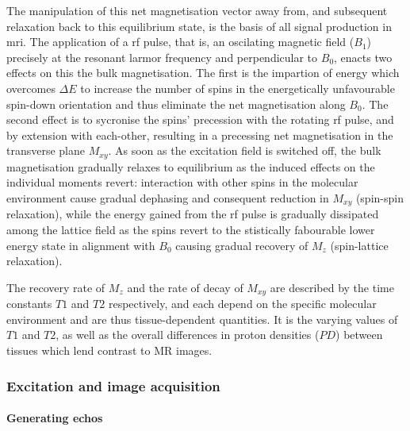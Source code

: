 The manipulation of this net magnetisation vector away from, and subsequent relaxation back to this equilibrium state, is the basis of all signal production in \gls{mri}.
The application of a \gls{rf} pulse, that is, an oscilating magnetic field ($B_1$) precisely at the resonant larmor frequency and perpendicular to $B_0$, enacts two effects on this the bulk magnetisation.
The first is the impartion  of energy which overcomes $\Delta E$  to increase the number of spins in the energetically unfavourable spin-down orientation and thus eliminate the net magnetisation along $B_0$.
The second effect is to sycronise the spins' precession with the rotating \gls{rf} pulse, and by extension with each-other, resulting in a precessing net magnetisation in the transverse plane $M_{xy}$.
As soon as the excitation field is switched off, the bulk magnetisation gradually relaxes to equilibrium as the induced effects on the individual moments revert:
interaction with other spins  in the molecular environment cause gradual dephasing and consequent reduction in $M_{xy}$ (spin-spin relaxation), while the energy gained from the \gls{rf} pulse is gradually dissipated among the lattice field  as the spins revert to the stistically fabourable lower energy state in alignment with $B_0$ causing gradual recovery of $M_z$ (spin-lattice relaxation).

The recovery rate of $M_z$ and the rate of decay of $M_{xy}$ are described by the time constants $T1$ and $T2$ respectively, and each depend on the specific molecular environment and are thus tissue-dependent quantities.
It is the varying values of $T1$ and $T2$, as well as the overall differences in proton densities ($PD$) between tissues which lend contrast to MR images.

\subsubsection{Excitation and image acquisition}


\paragraph{Generating echos}

